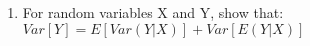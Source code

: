 \renewcommand{\theequation}{\theenumi}
\renewcommand{\thefigure}{\theenumi}
\renewcommand{\thetable}{\theenumi}
\begin{enumerate}[label=\thesection.\arabic*.,ref=\thesection.\theenumi]
%


\item For random variables X and Y, show that:
$Var[Y] = E[Var(Y|X)] + Var[E(Y|X)]$
%
\solution

%
\end{enumerate}